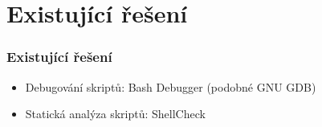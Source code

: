 \documentclass{beamer}
\begin{document}
\section{Existující řešení}
\begin{frame}
	\frametitle{Existující řešení}
	\begin{itemize}
		\item Debugování skriptů: Bash Debugger (podobné GNU GDB)
		\item Statická analýza skriptů: ShellCheck
	\end{itemize}
\end{frame}

%	
%		
%
%
\end{document}
